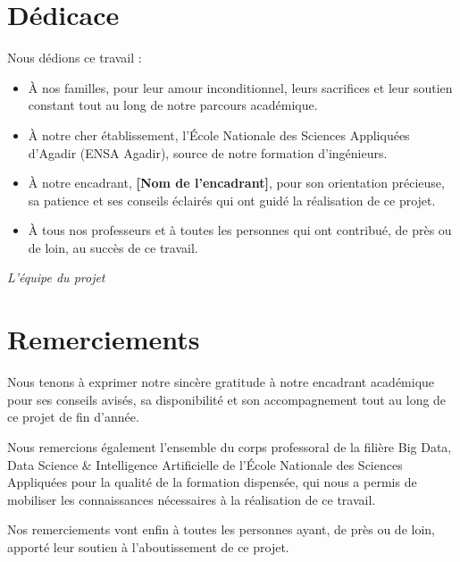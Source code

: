 \documentclass[12pt,a4paper]{report}
\begin{document}
\chapter*{Dédicace}
\thispagestyle{empty}

Nous dédions ce travail :

\begin{itemize}
    \item À nos familles, pour leur amour inconditionnel, leurs sacrifices et leur soutien constant tout au long de notre parcours académique.
    \item À notre cher établissement, l'École Nationale des Sciences Appliquées d'Agadir (ENSA Agadir), source de notre formation d'ingénieurs.
    \item À notre encadrant, \textbf{[Nom de l'encadrant]}, pour son orientation précieuse, sa patience et ses conseils éclairés qui ont guidé la réalisation de ce projet.
    \item À tous nos professeurs et à toutes les personnes qui ont contribué, de près ou de loin, au succès de ce travail.
\end{itemize}

\vspace{2cm}
\begin{center}
    \textit{L'équipe du projet}
\end{center}

\newpage
\chapter*{Remerciements}
\thispagestyle{empty}
Nous tenons à exprimer notre sincère gratitude à notre encadrant académique pour ses conseils avisés, sa disponibilité et son accompagnement tout au long de ce projet de fin d'année.

Nous remercions également l'ensemble du corps professoral de la filière Big Data, Data Science \& Intelligence Artificielle de l'École Nationale des Sciences Appliquées pour la qualité de la formation dispensée, qui nous a permis de mobiliser les connaissances nécessaires à la réalisation de ce travail.

Nos remerciements vont enfin à toutes les personnes ayant, de près ou de loin, apporté leur soutien à l'aboutissement de ce projet.
\newpage
\end{document}
